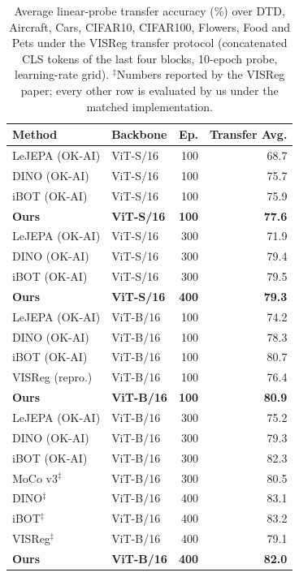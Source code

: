 \begin{table}[t]
\centering
\small
\begin{tabular}{llrr}
\toprule
Method & Backbone & Ep. & Transfer Avg. \\
\midrule
LeJEPA (OK-AI) & ViT-S/16 & 100 & 68.7 \\
DINO (OK-AI) & ViT-S/16 & 100 & 75.7 \\
iBOT (OK-AI) & ViT-S/16 & 100 & 75.9 \\
\textbf{Ours} & \textbf{ViT-S/16} & \textbf{100} & \textbf{77.6} \\
\midrule
LeJEPA (OK-AI) & ViT-S/16 & 300 & 71.9 \\
DINO (OK-AI) & ViT-S/16 & 300 & 79.4 \\
iBOT (OK-AI) & ViT-S/16 & 300 & 79.5 \\
\textbf{Ours} & \textbf{ViT-S/16} & \textbf{400} & \textbf{79.3} \\
\midrule
LeJEPA (OK-AI) & ViT-B/16 & 100 & 74.2 \\
DINO (OK-AI) & ViT-B/16 & 100 & 78.3 \\
iBOT (OK-AI) & ViT-B/16 & 100 & 80.7 \\
VISReg (repro.) & ViT-B/16 & 100 & 76.4 \\
\textbf{Ours} & \textbf{ViT-B/16} & \textbf{100} & \textbf{80.9} \\
\midrule
LeJEPA (OK-AI) & ViT-B/16 & 300 & 75.2 \\
DINO (OK-AI) & ViT-B/16 & 300 & 79.3 \\
iBOT (OK-AI) & ViT-B/16 & 300 & 82.3 \\
MoCo v3$^\ddag$ & ViT-B/16 & 300 & 80.5 \\
DINO$^\ddag$ & ViT-B/16 & 400 & 83.1 \\
iBOT$^\ddag$ & ViT-B/16 & 400 & 83.2 \\
VISReg$^\ddag$ & ViT-B/16 & 400 & 79.1 \\
\textbf{Ours} & \textbf{ViT-B/16} & \textbf{400} & \textbf{82.0} \\
\bottomrule
\end{tabular}
\caption{Average linear-probe transfer accuracy (\%) over DTD, Aircraft, Cars, CIFAR10, CIFAR100, Flowers, Food and Pets under the VISReg transfer protocol (concatenated CLS tokens of the last four blocks, 10-epoch probe, learning-rate grid). $^\ddag$Numbers reported by the VISReg paper; every other row is evaluated by us under the matched implementation.}
\label{tab:transfer-main}
\end{table}

